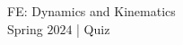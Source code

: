 \documentclass[addpoints, 12pt]{exam}
\begin{document}
\renewcommand{\arraystretch}{1.25}

\begin{center}

{\Large FE: Dynamics and Kinematics \\[0ex]
Spring $2024$ | Quiz}
\end{center}


\end{document}
